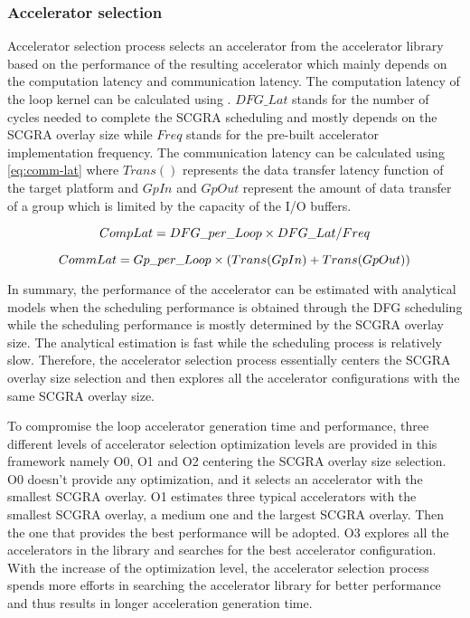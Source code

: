 \subsubsection{Accelerator selection}
Accelerator selection process selects an accelerator from the accelerator library based on the
performance of the resulting accelerator which mainly depends on the computation latency and
communication latency. The computation latency of the loop kernel can be calculated using
. $DFG\_Lat$ stands for the number of cycles needed to complete the SCGRA
scheduling and mostly depends on the SCGRA overlay size while $Freq$ stands for the pre-built
accelerator implementation frequency. The communication latency can be
calculated using \eqref{eq:comm-lat} where $Trans()$ represents the
data transfer latency function of the target platform and $GpIn$ and $GpOut$ represent the amount of
data transfer of a group which is limited by the capacity of the I/O buffers. 

\begin{equation} \label{eq:comp-lat}
    \footnotesize
    CompLat = DFG\_per\_Loop \times DFG\_Lat / Freq
\vspace{-2em}
\end{equation}


\begin{equation} \label{eq:comm-lat}
    \footnotesize
    CommLat = Gp\_per\_Loop \times (Trans(GpIn) + Trans(GpOut))
\end{equation}


In summary, the performance of the accelerator can be estimated with analytical models when the scheduling
performance is obtained through the DFG scheduling while the scheduling performance is mostly determined
by the SCGRA overlay size. The analytical estimation is fast while the scheduling process is
relatively slow. Therefore, the accelerator selection process essentially centers the SCGRA
overlay size selection and then explores all the accelerator configurations with the same SCGRA overlay size. 

To compromise the loop accelerator generation time and performance, three different levels of
accelerator selection optimization levels are provided in this framework namely O0, O1 and O2
centering the SCGRA overlay size selection.
O0 doesn't provide any optimization, and it selects an accelerator with the smallest SCGRA overlay.
O1 estimates three typical accelerators with the smallest SCGRA overlay, a medium one and the
largest SCGRA overlay. Then the one that provides the best performance will be adopted. O3 explores all
the accelerators in the library and searches for the best accelerator configuration. With the
increase of the optimization level, the accelerator selection process spends more efforts in
searching the accelerator library for better performance and thus results in longer acceleration
generation time.

